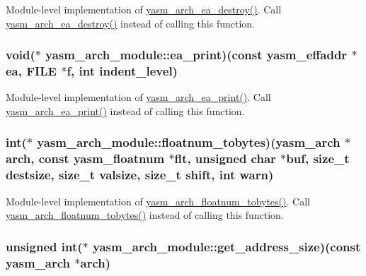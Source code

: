 Module-\/level implementation of \hyperlink{arch_8h_a535b9daa3638a8f8f5540cbc643170f3}{yasm\-\_\-arch\-\_\-ea\-\_\-destroy()}. Call \hyperlink{arch_8h_a535b9daa3638a8f8f5540cbc643170f3}{yasm\-\_\-arch\-\_\-ea\-\_\-destroy()} instead of calling this function. \hypertarget{structyasm__arch__module_a70b26bcf811aabae77bccd78594ca731}{
\subsubsection[{ea\-\_\-print}]{\setlength{\rightskip}{0pt plus 5cm}void($\ast$ yasm\-\_\-arch\-\_\-module\-::ea\-\_\-print)(const {\bf yasm\-\_\-effaddr} $\ast$ea, F\-I\-L\-E $\ast$f, int indent\-\_\-level)}}\label{structyasm__arch__module_a70b26bcf811aabae77bccd78594ca731}
Module-\/level implementation of \hyperlink{arch_8h_afaa5797a072eb925e3fc4f24f6a7b376}{yasm\-\_\-arch\-\_\-ea\-\_\-print()}. Call \hyperlink{arch_8h_afaa5797a072eb925e3fc4f24f6a7b376}{yasm\-\_\-arch\-\_\-ea\-\_\-print()} instead of calling this function. \hypertarget{structyasm__arch__module_adccc4dbe8cfed3b9a647622b70489468}{
\subsubsection[{floatnum\-\_\-tobytes}]{\setlength{\rightskip}{0pt plus 5cm}int($\ast$ yasm\-\_\-arch\-\_\-module\-::floatnum\-\_\-tobytes)({\bf yasm\-\_\-arch} $\ast$arch, const {\bf yasm\-\_\-floatnum} $\ast$flt, unsigned char $\ast$buf, size\-\_\-t destsize, size\-\_\-t valsize, size\-\_\-t shift, int {\bf warn})}}\label{structyasm__arch__module_adccc4dbe8cfed3b9a647622b70489468}
Module-\/level implementation of \hyperlink{arch_8h_a443bebaf0b9d66277efa056568f683a5}{yasm\-\_\-arch\-\_\-floatnum\-\_\-tobytes()}. Call \hyperlink{arch_8h_a443bebaf0b9d66277efa056568f683a5}{yasm\-\_\-arch\-\_\-floatnum\-\_\-tobytes()} instead of calling this function. \hypertarget{structyasm__arch__module_a3f82738da091b9e2967e795f4d59de76}{
\subsubsection[{get\-\_\-address\-\_\-size}]{\setlength{\rightskip}{0pt plus 5cm}unsigned int($\ast$ yasm\-\_\-arch\-\_\-module\-::get\-\_\-address\-\_\-size)(const {\bf yasm\-\_\-arch} $\ast$arch)}}\label{structyasm__arch__module_a3f82738da091b9e2967e795f4d59de76}
